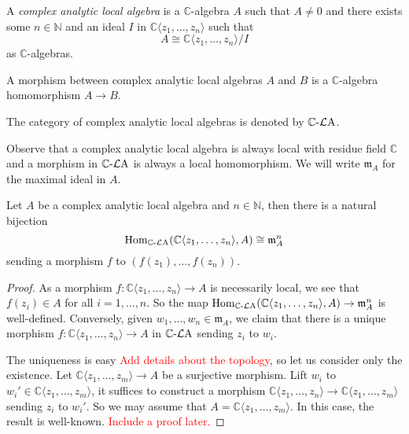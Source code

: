 \begin{definition}
    A \emph{complex analytic local algebra} is a $\mathbb{C}$-algebra $A$ such that $A\neq 0$ and there exists some $n\in \mathbb{N}$ and an ideal $I$ in $\mathbb{C}\langle z_1,\ldots,z_n \rangle$ such that 
    \[
        A\cong \mathbb{C}\langle z_1,\ldots,z_n \rangle/I
    \]
    as $\mathbb{C}$-algebras.

    A morphism between complex analytic local algebras $A$ and $B$ is a $\mathbb{C}$-algebra homomorphism $A\rightarrow B$.

    The category of complex analytic local algebras is denoted by $\mathbb{C}\text{-}\mathcal{L}\mathrm{A}$.
\end{definition}
Observe that a complex analytic local algebra is always local with residue field $\mathbb{C}$ and a morphism in $\mathbb{C}\text{-}\mathcal{L}\mathrm{A}$ is always a local homomorphism. We will write $\mathfrak{m}_A$ for the maximal ideal in $A$.

\begin{lemma}
    Let $A$ be a complex analytic local algebra and $n\in \mathbb{N}$, then there is a natural bijection
    \[
        \operatorname{Hom}_{\mathbb{C}\text{-}\mathcal{L}\mathrm{A}}(\mathbb{C}\langle z_1,\ldots,z_n \rangle,A)\cong \mathfrak{m}_{A}^n
    \]
    sending a morphism $f$ to $(f(z_1),\ldots,f(z_n))$.
\end{lemma}
\begin{proof}
    As a morphism $f:\mathbb{C}\langle z_1,\ldots,z_n \rangle \rightarrow A$ is necessarily local, we see that $f(z_i)\in A$ for all $i=1,\ldots,n$. So the map $\operatorname{Hom}_{\mathbb{C}\text{-}\mathcal{L}\mathrm{A}}(\mathbb{C}\langle z_1,\ldots,z_n \rangle,A)\rightarrow \mathfrak{m}_{A}^n$ is well-defined. Conversely, given $w_1,\ldots,w_n\in \mathfrak{m}_A$, we claim that there is a unique morphism $f:\mathbb{C}\langle z_1,\ldots,z_n \rangle \rightarrow A$ in $\mathbb{C}\text{-}\mathcal{L}\mathrm{A}$ sending $z_i$ to $w_i$.

    The uniqueness is easy \textcolor{red}{Add details about the topology}, so let us consider only the existence.
    Let $\mathbb{C}\langle z_1,\ldots,z_m \rangle \rightarrow A$ be a surjective morphism. Lift $w_i$ to $w_i'\in \mathbb{C}\langle z_1,\ldots,z_m \rangle$, it suffices to construct a morphism $\mathbb{C}\langle z_1,\ldots,z_n \rangle\rightarrow \mathbb{C}\langle z_1,\ldots,z_m \rangle$ sending $z_i$ to $w_i'$. So we may assume that $A=\mathbb{C}\langle z_1,\ldots,z_m \rangle$. In this case, the result is well-known. \textcolor{red}{Include a proof later.}
\end{proof}

